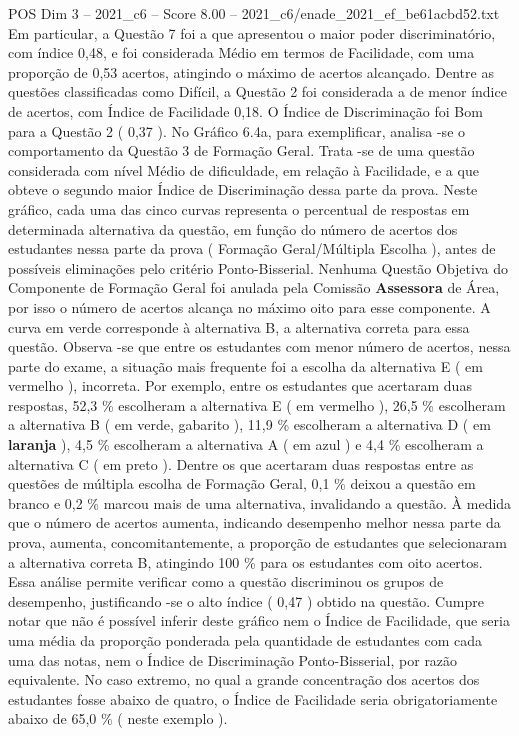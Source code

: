 \begin{textsample}{POS Dim 3 – 2021\_c6 – Score 8.00 – 2021\_c6/enade\_2021\_ef\_be61acbd52.txt}
Em particular, a Questão 7 foi a que apresentou o maior poder discriminatório, com índice 0,48, e foi considerada Médio em termos de Facilidade, com uma proporção de 0,53 acertos, atingindo o máximo de acertos alcançado.
Dentre as questões classificadas como Difícil, a Questão 2 foi considerada a de menor índice de acertos, com Índice de Facilidade 0,18.
O Índice de Discriminação foi Bom para a Questão 2 ( 0,37 ).
No Gráfico 6.4a, para exemplificar, analisa -se o comportamento da Questão 3 de Formação Geral.
Trata -se de uma questão considerada com nível Médio de dificuldade, em relação à Facilidade, e a que obteve o segundo maior Índice de Discriminação dessa parte da prova.
Neste gráfico, cada uma das cinco curvas representa o percentual de respostas em determinada alternativa da questão, em função do número de acertos dos estudantes nessa parte da prova ( Formação Geral/Múltipla Escolha ), antes de possíveis eliminações pelo critério Ponto-Bisserial.
Nenhuma Questão Objetiva do Componente de Formação Geral foi anulada pela Comissão \textbf{Assessora} de Área, por isso o número de acertos alcança no máximo oito para esse componente.
A curva em verde corresponde à alternativa B, a alternativa correta para essa questão.
Observa -se que entre os estudantes com menor número de acertos, nessa parte do exame, a situação mais frequente foi a escolha da alternativa E ( em vermelho ), incorreta.
Por exemplo, entre os estudantes que acertaram duas respostas, 52,3 \% escolheram a alternativa E ( em vermelho ), 26,5 \% escolheram a alternativa B ( em verde, gabarito ), 11,9 \% escolheram a alternativa D ( em \textbf{laranja} ), 4,5 \% escolheram a alternativa A ( em azul ) e 4,4 \% escolheram a alternativa C ( em preto ).
Dentre os que acertaram duas respostas entre as questões de múltipla escolha de Formação Geral, 0,1 \% deixou a questão em branco e 0,2 \% marcou mais de uma alternativa, invalidando a questão.
À medida que o número de acertos aumenta, indicando desempenho melhor nessa parte da prova, aumenta, concomitantemente, a proporção de estudantes que selecionaram a alternativa correta B, atingindo 100 \% para os estudantes com oito acertos.
Essa análise permite verificar como a questão discriminou os grupos de desempenho, justificando -se o alto índice ( 0,47 ) obtido na questão.
Cumpre notar que não é possível inferir deste gráfico nem o Índice de Facilidade, que seria uma média da proporção ponderada pela quantidade de estudantes com cada uma das notas, nem o Índice de Discriminação Ponto-Bisserial, por razão equivalente.
No caso extremo, no qual a grande concentração dos acertos dos estudantes fosse abaixo de quatro, o Índice de Facilidade seria obrigatoriamente abaixo de 65,0 \% ( neste exemplo ).

\end{textsample}
